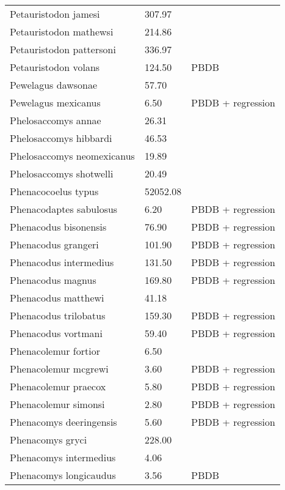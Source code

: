 \begin{longtable}{p{} p{} p{}}
    Petauristodon jamesi & 307.97 & \cite{Tomiya2013} \\ 
    Petauristodon mathewsi & 214.86 & \cite{Tomiya2013} \\ 
    Petauristodon pattersoni & 336.97 & \cite{Tomiya2013} \\ 
    Petauristodon volans & 124.50 & PBDB \\ 
    Pewelagus dawsonae & 57.70 & \cite{Jepsen1932} \\ 
    Pewelagus mexicanus & 6.50 & PBDB + regression \\ 
    Phelosaccomys annae & 26.31 & \cite{Tomiya2013} \\ 
    Phelosaccomys hibbardi & 46.53 & \cite{Tomiya2013} \\ 
    Phelosaccomys neomexicanus & 19.89 & \cite{Tomiya2013} \\ 
    Phelosaccomys shotwelli & 20.49 & \cite{Tomiya2013} \\ 
    Phenacocoelus typus & 52052.08 & \cite{Tomiya2013} \\ 
    Phenacodaptes sabulosus & 6.20 & PBDB + regression \\ 
    Phenacodus bisonensis & 76.90 & PBDB + regression \\ 
    Phenacodus grangeri & 101.90 & PBDB + regression \\ 
    Phenacodus intermedius & 131.50 & PBDB + regression \\ 
    Phenacodus magnus & 169.80 & PBDB + regression \\ 
    Phenacodus matthewi & 41.18 & \cite{Cope1871} \\ 
    Phenacodus trilobatus & 159.30 & PBDB + regression \\ 
    Phenacodus vortmani & 59.40 & PBDB + regression \\ 
    Phenacolemur fortior & 6.50 & \cite{Wood1962} \\ 
    Phenacolemur mcgrewi & 3.60 & PBDB + regression \\ 
    Phenacolemur praecox & 5.80 & PBDB + regression \\ 
    Phenacolemur simonsi & 2.80 & PBDB + regression \\ 
    Phenacomys deeringensis & 5.60 & PBDB + regression \\ 
    Phenacomys gryci & 228.00 & \cite{McKenna2011} \\ 
    Phenacomys intermedius & 4.06 & \cite{Smith2004} \\ 
    Phenacomys longicaudus & 3.56 & PBDB \\ 

\end{longtable}
